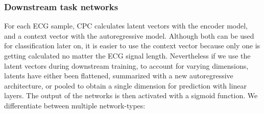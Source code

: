 \subsubsection{Downstream task networks}\label{sec:cpc-downnetwork}
For each ECG sample, CPC calculates latent vectors with the encoder model, and a context vector with the autoregressive model. Although both can be used for classification later on, it is easier to use the context vector because only one is getting calculated no matter the ECG signal length. Nevertheless if we use the latent vectors during downstream training, to account for varying dimensions, latents have either been flattened, summarized with a new autoregressive architecture, or pooled to obtain a single dimension for prediction with linear layers. The output of the networks is then activated with a sigmoid function. We differentiate between multiple network-types:
